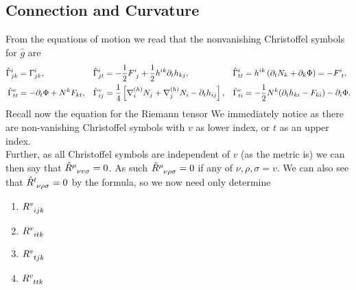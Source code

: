 \documentclass{article}
\begin{document}
\subsection{Connection and Curvature}
From the equations of motion we read that the nonvanishing Christoffel symbols for $\hat g$ are
\begin{align*}
\hat \Gamma\sp{i}_{jk}&=  \Gamma\sp{i}_{jk},
&\hat \Gamma\sp{i}_{jt}&=-\frac12 F\sp{i}_{\ j}+\frac12 h\sp{ik}\partial_t h_{kj},
&\hat \Gamma\sp{i}_{tt}&=h\sp{ik} \left( \partial_t N_k +\partial_{k} \Phi \right)= -F\sp{i}_{\ t},
\\
\hat \Gamma\sp{v}_{tt}&=-\partial_t \Phi+N\sp{k}F_{kt}, 
&\hat \Gamma\sp{v}_{ij}&=\frac14\left[\nabla\sp{(h)}_{i}N_{j}+\nabla\sp{(h)}_{j}N_{i}-\partial_t h_{ij}\right],
&\hat \Gamma\sp{v}_{ti}&=-\frac12 N\sp{k} (\partial_t h_{ki} -F_{ki}) -\partial_i\Phi .
\end{align*}
Recall now the equation for the Riemann tensor 
We immediately notice 
as there are non-vanishing Christoffel symbols with $v$ as lower index, or $t$ as an upper index. \\
Further, as all Christoffel symbols are independent of $v$ (as the metric is) we can then say that $\hat{R}\indices{^\mu_\nu_v_\sigma} = 0$. As such $\hat{R}\indices{^\mu_\nu_\rho_\sigma}=0$ if any of $\nu,\rho,\sigma=v$. We can also see that $\hat{R}\indices{^t_\nu_\rho_\sigma}=0$ by the formula, so we now need only determine
\begin{center}
\begin{enumerate}
	\item $R\indices{^v_i_j_k}$
	\item $R\indices{^v_i_t_k}$
	\item $R\indices{^v_t_j_k}$
	\item $R\indices{^v_t_t_k}$
\end{enumerate}
\end{center}
	 
\end{document}
